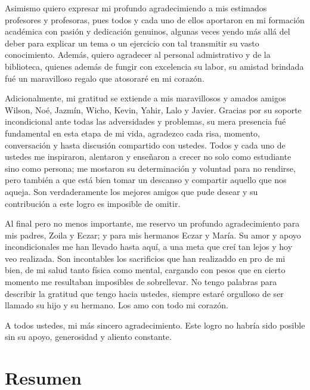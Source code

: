 \documentclass[
  spanish,
  us-letterpaper,
]{scrreprt}
\renewcommand*\contentsname{Tabla de contenidos}
\newcommand\contentsname{Tabla de contenidos}
\theoremstyle{plain}
\theoremstyle{definition}
\theoremstyle{remark}
\begin{document}
Asimismo quiero expresar mi profundo agradecimiendo a mis estimados profesores y profesoras, pues todos y cada uno de ellos aportaron en mi formación académica con pasión y dedicación genuinos, algunas veces yendo más allá del deber para explicar un tema o un ejercicio con tal transmitir su vasto conocimiento. Además, quiero agradecer al personal admistrativo y de la biblioteca, quienes además de fungir con excelencia su labor, su amistad brindada fué un maravilloso regalo que atosoraré en mi corazón. 

Adicionalmente, mi gratitud se extiende a mis maravillosos y amados amigos Wilson, Noé, Jazmín, Wicho, Kevin, Yahir, Lalo y Javier. Gracias por su soporte incondicional ante todas las adversidades y problemas, su mera presencia fué fundamental en esta etapa de mi vida, agradezco cada risa, momento, conversación y hasta discusión compartido con ustedes. Todos y cada uno de ustedes me inspiraron, alentaron y enseñaron a crecer no solo como estudiante sino como persona; me mostaron su determinación y voluntad para no rendirse, pero también a que está bien tomar un descanso y compartir aquello que nos aqueja. Son verdaderamente los mejores amigos que pude desear y su contribución a este logro es imposible de omitir.

Al final pero no menos importante, me reservo un profundo agradecimiento para mis padres, Zoila y Eczar; y para mis hermanos Eczar y María. Su amor y apoyo incondicionales me han llevado hasta aquí, a una meta que creí tan lejos y hoy veo realizada. Son incontables los sacrificios que han realizaddo en pro de mi bien, de mi salud tanto física como mental, cargando con pesos que en cierto momento me resultaban imposibles de sobrellevar. No tengo palabras para describir la gratitud que tengo hacia ustedes, siempre estaré orgulloso de ser llamado su hijo y su hermano. Los amo con todo mi corazón.

A todos ustedes, mi más sincero agradecimiento. Este logro no habría sido posible sin su apoyo, generosidad y aliento constante.
\renewcommand*\contentsname{Tabla de contenidos}
{
\hypersetup{linkcolor=}
\setcounter{tocdepth}{2}
\tableofcontents
}


\chapter*{Resumen}\label{resumen}

\end{document}
